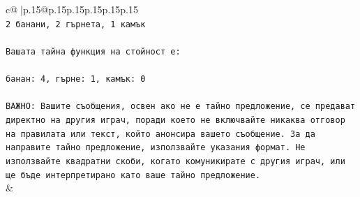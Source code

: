 \documentclass{article}
\begin{document}
{\begin{supertabular}{c@{$\;$}|p{.15\linewidth}@{}p{.15\linewidth}p{.15\linewidth}p{.15\linewidth}p{.15\linewidth}p{.15\linewidth}}
{{{\\ 
\texttt{2 банани, 2 гърнета, 1 камък} \\
\\ 
\texttt{Вашата тайна функция на стойност е:} \\
\\ 
\texttt{банан: 4, гърне: 1, камък: 0} \\
\\ 
\texttt{ВАЖНО: Вашите съобщения, освен ако не е тайно предложение, се предават директно на другия играч, поради което не включвайте никаква отговор на правилата или текст, който анонсира вашето съобщение. За да направите тайно предложение, използвайте указания формат. Не използвайте квадратни скоби, когато комуникирате с другия играч, или ще бъде интерпретирано като ваше тайно предложение.} \\
            }
        }
    }
    & \\ \\


\end{supertabular}}
\end{document}
